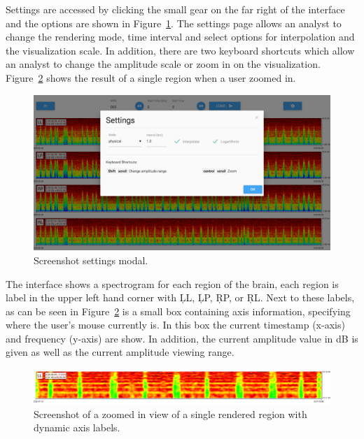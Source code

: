 Settings are accessed by clicking the small gear on the far right of the
interface and the options are shown in Figure~\ref{fig:settings}. The settings
page allows an analyst to change the rendering mode, time interval and select
options for interpolation and the visualization scale. In addition, there are
two keyboard shortcuts which allow an analyst to change the amplitude scale or
zoom in on the visualization. Figure~\ref{fig:zoomed-region} shows the result
of a single region when a user zoomed in. \\

\begin{figure}[h]
\begin{center}
\includegraphics[scale=0.35]{./img/settings.png}
\caption{Screenshot settings modal.}
\label{fig:settings}
\end{center}
\end{figure}

The interface shows a spectrogram for each region of the brain, each region is
label in the upper left hand corner with \c{LL}, \c{LP}, \c{RP}, or \c{RL}.
Next to these labels, as can be seen in Figure~\ref{fig:zoomed-region} is a
small box containing axis information, specifying where the user's mouse
currently is. In this box the current timestamp (x-axis) and frequency (y-axis)
are show. In addition, the current amplitude value in dB is given as well as
the current amplitude viewing range. \\

\begin{figure}[h]
\begin{center}
\includegraphics[scale=0.35]{./img/zoomed-region.png}
\caption{Screenshot of a zoomed in view of a single rendered region with
  dynamic axis labels.}
\label{fig:zoomed-region}
\end{center}
\end{figure}

